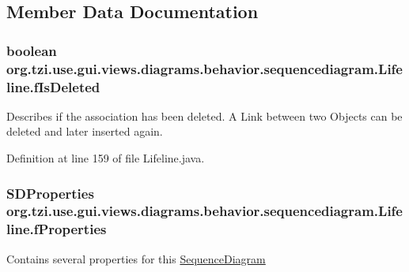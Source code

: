 \subsection{Member Data Documentation}
\hypertarget{classorg_1_1tzi_1_1use_1_1gui_1_1views_1_1diagrams_1_1behavior_1_1sequencediagram_1_1_lifeline_a6ed9d69272aea6a14ab32f3d560601e5}{
\subsubsection[{f\-Is\-Deleted}]{\setlength{\rightskip}{0pt plus 5cm}boolean org.\-tzi.\-use.\-gui.\-views.\-diagrams.\-behavior.\-sequencediagram.\-Lifeline.\-f\-Is\-Deleted\hspace{0.3cm}{\ttfamily [protected]}}}\label{classorg_1_1tzi_1_1use_1_1gui_1_1views_1_1diagrams_1_1behavior_1_1sequencediagram_1_1_lifeline_a6ed9d69272aea6a14ab32f3d560601e5}
Describes if the association has been deleted. A Link between two Objects can be deleted and later inserted again. 

Definition at line 159 of file Lifeline.\-java.

\hypertarget{classorg_1_1tzi_1_1use_1_1gui_1_1views_1_1diagrams_1_1behavior_1_1sequencediagram_1_1_lifeline_a5b1024f01406ad26e2c44fff68e492a6}{
\subsubsection[{f\-Properties}]{\setlength{\rightskip}{0pt plus 5cm}S\-D\-Properties org.\-tzi.\-use.\-gui.\-views.\-diagrams.\-behavior.\-sequencediagram.\-Lifeline.\-f\-Properties\hspace{0.3cm}{\ttfamily [protected]}}}\label{classorg_1_1tzi_1_1use_1_1gui_1_1views_1_1diagrams_1_1behavior_1_1sequencediagram_1_1_lifeline_a5b1024f01406ad26e2c44fff68e492a6}
Contains several properties for this \hyperlink{classorg_1_1tzi_1_1use_1_1gui_1_1views_1_1diagrams_1_1behavior_1_1sequencediagram_1_1_sequence_diagram}{Sequence\-Diagram} 

